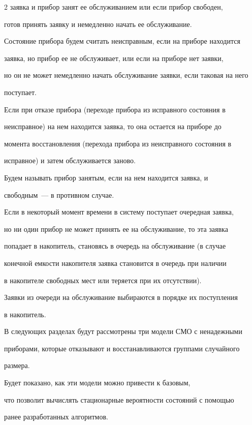 \begin{multicols}{2}
заявка и прибор занят ее обслуживанием или если прибор свободен,


готов принять заявку и немедленно начать ее обслуживание.


Состояние прибора будем считать неисправным, если на приборе находится


заявка, но прибор ее не обслуживает, или если на приборе нет заявки,


но он не может немедленно начать обслуживание заявки, если таковая на него


поступает.


Если при отказе прибора (переходе прибора из исправного состояния в


неисправное) на нем находится заявка, то она остается на приборе до


момента восстановления (перехода прибора из неисправного состояния в


исправное) и затем обслуживается заново.





Будем называть прибор занятым, если на нем находится заявка, и


свободным~--- в противном случае.


Если в некоторый момент времени в систему поступает очередная заявка,


но ни один прибор не может принять ее на обслуживание, то эта заявка


попадает в накопитель, становясь в очередь на обслуживание (в случае


конечной емкости накопителя заявка становится в очередь при наличии


в накопителе свободных мест или теряется при их отсутствии).


Заявки из очереди на обслуживание выбираются в порядке их поступления


в накопитель.





В следующих разделах будут рассмотрены три модели СМО с ненадежными


приборами, которые отказывают и восстанавливаются группами случайного


размера.


Будет показано, как эти модели можно привести к базовым,


что позволит вычислять стационарные вероятности состояний с помощью


ранее разработанных алгоритмов.



\end{multicols}
